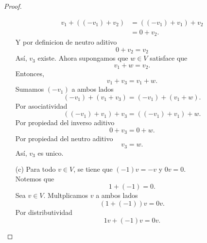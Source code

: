 \documentclass[12pt,a4paper]{article}
\begin{document}
\begin{proof}
\begin{enumerate}
            \begin{align*}
                v_{1}+((-v_{1})+v_{2})&=((-v_{1})+v_{1})+v_{2}\\
                &=0+v_{2}.
            \end{align*}
            Y por definicion de neutro aditivo
            \begin{equation*}
                0+v_{2}=v_{2}
            \end{equation*}
            Así, $v_{3}$ existe. Ahora supongamos que $w\in V$ satisface que
            \begin{equation*}
                v_{1}+w=v_{2}.
            \end{equation*}
            Entonces,
            \begin{equation*}
                v_{1}+v_{3}=v_{1}+w.
            \end{equation*}
            Sumamos $(-v_{1})$ a ambos lados
            \begin{equation*}
                (-v_{1})+(v_{1}+v_{3})=(-v_{1})+(v_{1}+w).
            \end{equation*}
            Por asociatividad
            \begin{equation*}
                ((-v_{1})+v_{1})+v_{3}=((-v_{1})+v_{1})+w.
            \end{equation*}
            Por propiedad del inverso aditivo
            \begin{equation*}
                0+v_{3}=0+w.
            \end{equation*}
            Por propiedad del neutro aditivo
            \begin{equation*}
                v_{3}=w.
            \end{equation*}
            Así, $v_{3}$ es unico.
            \item[(c)] Para todo $v\in V$, se tiene que $(-1)v=-v$ y $0v=0$.\\
            Notemos que
            \begin{equation*}
                1+(-1)=0.
            \end{equation*}
            Sea $v\in V$. Multplicamos $v$ a ambos lados
            \begin{equation*}
                (1+(-1))v=0v.
            \end{equation*}
            Por distributividad
            \begin{equation*}
                1v+(-1)v=0v.
            \end{equation*}

\end{enumerate}
\end{proof}
\end{document}
